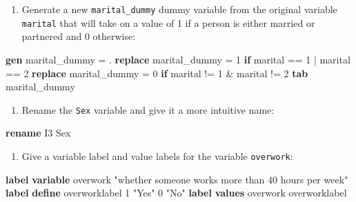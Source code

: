 \documentclass[
]{book}
\newenvironment{Shaded}{\begin{snugshade}}{\end{snugshade}}
\newcommand{\KeywordTok}[1]{\textcolor[rgb]{0.13,0.29,0.53}{\textbf{#1}}}
\newcommand{\NormalTok}[1]{#1}
\newcommand{\StringTok}[1]{\textcolor[rgb]{0.31,0.60,0.02}{#1}}
\providecommand{\tightlist}{%
  \setlength{\itemsep}{0pt}\setlength{\parskip}{0pt}}
\begin{document}
\begin{alert}
\begin{enumerate}
\def\labelenumi{\arabic{enumi}.}
\setcounter{enumi}{3}
\tightlist
\item
  Generate a new \texttt{marital\_dummy} dummy variable from the original variable \texttt{marital} that will take on a value of 1 if a person is either married or partnered and 0 otherwise:
\end{enumerate}

\begin{Shaded}
\begin{Highlighting}[]
\KeywordTok{gen}\NormalTok{ marital\_dummy = .}
\KeywordTok{replace}\NormalTok{ marital\_dummy = 1 }\KeywordTok{if}\NormalTok{ marital == 1 | marital == 2}
\KeywordTok{replace}\NormalTok{ marital\_dummy = 0 }\KeywordTok{if}\NormalTok{ marital != 1 \& marital != 2}
\KeywordTok{tab}\NormalTok{ marital\_dummy}
\end{Highlighting}
\end{Shaded}

\begin{enumerate}
\def\labelenumi{\arabic{enumi}.}
\setcounter{enumi}{4}
\tightlist
\item
  Rename the \texttt{Sex} variable and give it a more intuitive name:
\end{enumerate}

\begin{Shaded}
\begin{Highlighting}[]
\KeywordTok{rename}\NormalTok{ I3 Sex}
\end{Highlighting}
\end{Shaded}

\begin{enumerate}
\def\labelenumi{\arabic{enumi}.}
\setcounter{enumi}{5}
\tightlist
\item
  Give a variable label and value labels for the variable \texttt{overwork}:
\end{enumerate}

\begin{Shaded}
\begin{Highlighting}[]
\KeywordTok{label} \KeywordTok{variable}\NormalTok{ overwork }\StringTok{"whether someone works more than 40 hours per week"}
\KeywordTok{label} \KeywordTok{define}\NormalTok{ overworklabel 1 }\StringTok{"Yes"}\NormalTok{ 0 }\StringTok{"No"}
\KeywordTok{label} \KeywordTok{values}\NormalTok{ overwork overworklabel}
\end{Highlighting}
\end{Shaded}


\end{alert}
\end{document}
